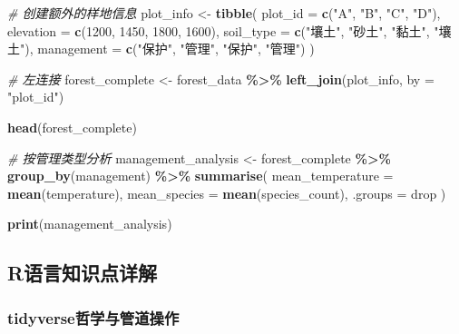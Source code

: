 \documentclass[
]{book}
\newenvironment{Shaded}{\begin{snugshade}}{\end{snugshade}}
\newcommand{\AttributeTok}[1]{\textcolor[rgb]{0.13,0.29,0.53}{#1}}
\newcommand{\CommentTok}[1]{\textcolor[rgb]{0.56,0.35,0.01}{\textit{#1}}}
\newcommand{\DecValTok}[1]{\textcolor[rgb]{0.00,0.00,0.81}{#1}}
\newcommand{\FunctionTok}[1]{\textcolor[rgb]{0.13,0.29,0.53}{\textbf{#1}}}
\newcommand{\NormalTok}[1]{#1}
\newcommand{\OtherTok}[1]{\textcolor[rgb]{0.56,0.35,0.01}{#1}}
\newcommand{\SpecialCharTok}[1]{\textcolor[rgb]{0.81,0.36,0.00}{\textbf{#1}}}
\newcommand{\StringTok}[1]{\textcolor[rgb]{0.31,0.60,0.02}{#1}}
\begin{document}
\begin{Shaded}
\begin{Highlighting}[]
\CommentTok{\# 创建额外的样地信息}
\NormalTok{plot\_info }\OtherTok{\textless{}{-}} \FunctionTok{tibble}\NormalTok{(}
  \AttributeTok{plot\_id =} \FunctionTok{c}\NormalTok{(}\StringTok{"A"}\NormalTok{, }\StringTok{"B"}\NormalTok{, }\StringTok{"C"}\NormalTok{, }\StringTok{"D"}\NormalTok{),}
  \AttributeTok{elevation =} \FunctionTok{c}\NormalTok{(}\DecValTok{1200}\NormalTok{, }\DecValTok{1450}\NormalTok{, }\DecValTok{1800}\NormalTok{, }\DecValTok{1600}\NormalTok{),}
  \AttributeTok{soil\_type =} \FunctionTok{c}\NormalTok{(}\StringTok{"壤土"}\NormalTok{, }\StringTok{"砂土"}\NormalTok{, }\StringTok{"黏土"}\NormalTok{, }\StringTok{"壤土"}\NormalTok{),}
  \AttributeTok{management =} \FunctionTok{c}\NormalTok{(}\StringTok{"保护"}\NormalTok{, }\StringTok{"管理"}\NormalTok{, }\StringTok{"保护"}\NormalTok{, }\StringTok{"管理"}\NormalTok{)}
\NormalTok{)}

\CommentTok{\# 左连接}
\NormalTok{forest\_complete }\OtherTok{\textless{}{-}}\NormalTok{ forest\_data }\SpecialCharTok{\%\textgreater{}\%}
  \FunctionTok{left\_join}\NormalTok{(plot\_info, }\AttributeTok{by =} \StringTok{"plot\_id"}\NormalTok{)}

\FunctionTok{head}\NormalTok{(forest\_complete)}

\CommentTok{\# 按管理类型分析}
\NormalTok{management\_analysis }\OtherTok{\textless{}{-}}\NormalTok{ forest\_complete }\SpecialCharTok{\%\textgreater{}\%}
  \FunctionTok{group\_by}\NormalTok{(management) }\SpecialCharTok{\%\textgreater{}\%}
  \FunctionTok{summarise}\NormalTok{(}
    \AttributeTok{mean\_temperature =} \FunctionTok{mean}\NormalTok{(temperature),}
    \AttributeTok{mean\_species =} \FunctionTok{mean}\NormalTok{(species\_count),}
    \AttributeTok{.groups =} \StringTok{\textquotesingle{}drop\textquotesingle{}}
\NormalTok{  )}

\FunctionTok{print}\NormalTok{(management\_analysis)}
\end{Highlighting}
\end{Shaded}

\hypertarget{rux8bedux8a00ux77e5ux8bc6ux70b9ux8be6ux89e3-8}{%
\subsection{R语言知识点详解}\label{rux8bedux8a00ux77e5ux8bc6ux70b9ux8be6ux89e3-8}}

\hypertarget{tidyverseux54f2ux5b66ux4e0eux7ba1ux9053ux64cdux4f5c}{%
\subsubsection{tidyverse哲学与管道操作}\label{tidyverseux54f2ux5b66ux4e0eux7ba1ux9053ux64cdux4f5c}}
\end{document}
